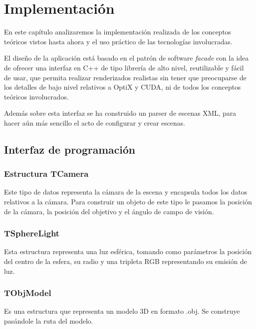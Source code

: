 \chapter{Implementación}

En este capítulo analizaremos la implementación realizada de los conceptos teóricos vistos hasta ahora y el uso práctico de las tecnologías involucradas.

\medskip

El diseño de la aplicación está basado en el patrón de software \emph{facade} con la idea de ofrecer una interfaz en C++ de tipo librería de alto nivel, reutilizable y fácil de usar, que permita realizar renderizados realistas sin tener que preocuparse de los detalles de bajo nivel relativos a OptiX y CUDA, ni de todos los conceptos teóricos involucrados.

\medskip

Además sobre esta interfaz se ha construido un parser de escenas XML, para hacer aún más sencillo el acto de configurar y crear escenas.

\clearpage

\section{Interfaz de programación}

\subsection{Estructura TCamera}

Este tipo de datos representa la cámara de la escena y encapsula todos los datos relativos a la cámara. Para construir un objeto de este tipo le pasamos la posición de la cámara, la posición del objetivo y el ángulo de campo de visión.

\subsection{TSphereLight}

Esta estructura representa una luz esférica, tomando como parámetros la posición del centro de la esfera, su radio y una tripleta RGB representando su emisión de luz.

\subsection{TObjModel}

Es una estructura que representa un modelo 3D en formato .obj. Se construye pasándole la ruta del modelo. 

